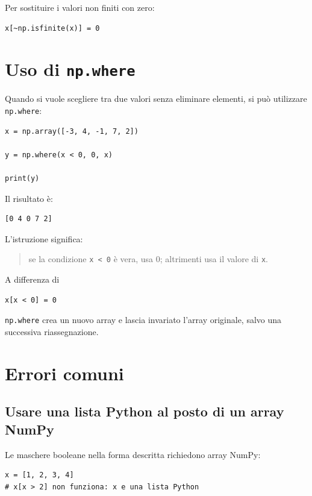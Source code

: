\documentclass[11pt,a4paper]{book}
\begin{document}
Per sostituire i valori non finiti con zero:

\begin{lstlisting}
x[~np.isfinite(x)] = 0
\end{lstlisting}

\section{Uso di \texttt{np.where}}

Quando si vuole scegliere tra due valori senza eliminare elementi, si può utilizzare \texttt{np.where}:

\begin{lstlisting}
x = np.array([-3, 4, -1, 7, 2])

y = np.where(x < 0, 0, x)

print(y)
\end{lstlisting}

Il risultato è:

\begin{lstlisting}
[0 4 0 7 2]
\end{lstlisting}

L'istruzione significa:

\begin{quote}
se la condizione \texttt{x < 0} è vera, usa 0; altrimenti usa il valore di \texttt{x}.
\end{quote}

A differenza di

\begin{lstlisting}
x[x < 0] = 0
\end{lstlisting}

\texttt{np.where} crea un nuovo array e lascia invariato l'array originale, salvo una successiva riassegnazione.

\section{Errori comuni}

\subsection{Usare una lista Python al posto di un array NumPy}

Le maschere booleane nella forma descritta richiedono array NumPy:

\begin{lstlisting}
x = [1, 2, 3, 4]
# x[x > 2] non funziona: x e una lista Python
\end{lstlisting}
\end{document}
